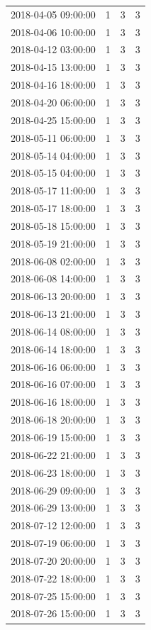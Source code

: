 \begin{tabular}{lrrr}
2018-04-05 09:00:00 & 1 & 3 & 3 \\
2018-04-06 10:00:00 & 1 & 3 & 3 \\
2018-04-12 03:00:00 & 1 & 3 & 3 \\
2018-04-15 13:00:00 & 1 & 3 & 3 \\
2018-04-16 18:00:00 & 1 & 3 & 3 \\
2018-04-20 06:00:00 & 1 & 3 & 3 \\
2018-04-25 15:00:00 & 1 & 3 & 3 \\
2018-05-11 06:00:00 & 1 & 3 & 3 \\
2018-05-14 04:00:00 & 1 & 3 & 3 \\
2018-05-15 04:00:00 & 1 & 3 & 3 \\
2018-05-17 11:00:00 & 1 & 3 & 3 \\
2018-05-17 18:00:00 & 1 & 3 & 3 \\
2018-05-18 15:00:00 & 1 & 3 & 3 \\
2018-05-19 21:00:00 & 1 & 3 & 3 \\
2018-06-08 02:00:00 & 1 & 3 & 3 \\
2018-06-08 14:00:00 & 1 & 3 & 3 \\
2018-06-13 20:00:00 & 1 & 3 & 3 \\
2018-06-13 21:00:00 & 1 & 3 & 3 \\
2018-06-14 08:00:00 & 1 & 3 & 3 \\
2018-06-14 18:00:00 & 1 & 3 & 3 \\
2018-06-16 06:00:00 & 1 & 3 & 3 \\
2018-06-16 07:00:00 & 1 & 3 & 3 \\
2018-06-16 18:00:00 & 1 & 3 & 3 \\
2018-06-18 20:00:00 & 1 & 3 & 3 \\
2018-06-19 15:00:00 & 1 & 3 & 3 \\
2018-06-22 21:00:00 & 1 & 3 & 3 \\
2018-06-23 18:00:00 & 1 & 3 & 3 \\
2018-06-29 09:00:00 & 1 & 3 & 3 \\
2018-06-29 13:00:00 & 1 & 3 & 3 \\
2018-07-12 12:00:00 & 1 & 3 & 3 \\
2018-07-19 06:00:00 & 1 & 3 & 3 \\
2018-07-20 20:00:00 & 1 & 3 & 3 \\
2018-07-22 18:00:00 & 1 & 3 & 3 \\
2018-07-25 15:00:00 & 1 & 3 & 3 \\
2018-07-26 15:00:00 & 1 & 3 & 3 \\

\end{tabular}
